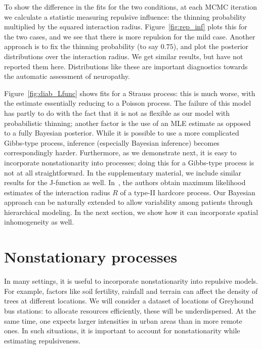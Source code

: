 \documentclass{statsoc}
\begin{document}
To show the difference in the fits for the two conditions, at each MCMC iteration we calculate a statistic measuring repulsive influence: the thinning 
probability multiplied by the squared interaction radius. Figure~\ref{fig:rep_inf} plots this for the two cases, and we see that there is more
repulsion for the mild case. Another approach is to fix the thinning probability (to say $0.75$), and plot the posterior distributions over the
interaction radius. We get similar results, but have not reported them here. Distributions like these are important diagnostics towards
the automatic assessment of neuropathy.

  Figure~\ref{fig:diab_Lfunc} shows fits for a Strauss process: this is much
  worse, with the estimate essentially reducing to a Poisson process. 
  The failure of this model has partly to do with the fact that it is not as flexible as our \matern model
  with probabilistic thinning; another factor is the use of an MLE estimate as opposed to a fully Bayesian posterior.
  While it is possible to use a more complicated Gibbs-type process, inference (especially Bayesian inference) becomes
  correspondingly harder. Furthermore, as we demonstrate next, it is easy to incorporate nonstationarity into \matern
  processes; doing this for a Gibbs-type process is not at all straightforward. In the supplementary material, we include similar
  results for the J-function as well.
  In~\cite{WallSar11}, the authors obtain maximum likelihood estimates of the interaction radius $R$ of a \matern type-II hardcore process.
  Our Bayesian approach can be naturally extended to allow variability among patients through hierarchical modeling. In the next section,
  we show how it can incorporate spatial inhomogeneity as well.

\section{Nonstationary \matern processes}  \label{sec:inhom_mat}
In many settings, it is useful to %
incorporate nonstationarity into repulsive models. %
For example, factors like soil fertility, rainfall and terrain can affect the density of trees at different locations. 
We will consider a dataset of locations of Greyhound bus stations: to allocate resources efficiently, these will be underdispersed.
At the same time, one expects larger intensities in urban areas than in more remote ones.
In such situations, it is important to account for nonstationarity while estimating repulsiveness.
\end{document}
